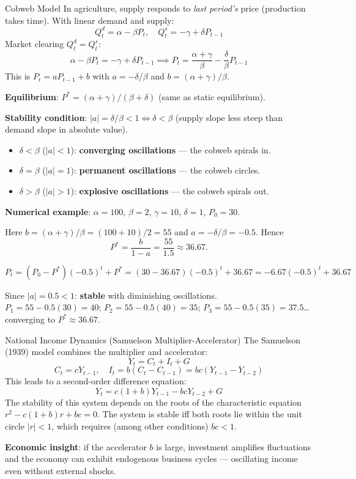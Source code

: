 \documentclass[12pt, a4paper]{article}
\theoremstyle{definition}
\begin{document}
\begin{exbox}{Cobweb Model}
In agriculture, supply responds to \emph{last period's} price (production
takes time). With linear demand and supply:
\[
  Q_t^d = \alpha - \beta P_t, \quad Q_t^s = -\gamma + \delta P_{t-1}
\]
Market clearing $Q_t^d = Q_t^s$:
\[
  \alpha - \beta P_t = -\gamma + \delta P_{t-1}
  \implies P_t = \frac{\alpha+\gamma}{\beta} - \frac{\delta}{\beta}P_{t-1}
\]
This is $P_t = aP_{t-1} + b$ with $a = -\delta/\beta$ and $b=(\alpha+\gamma)/\beta$.

\textbf{Equilibrium}: $P^* = (\alpha+\gamma)/(\beta+\delta)$ (same as static equilibrium).

\textbf{Stability condition}: $|a|=\delta/\beta < 1 \iff \delta < \beta$
(supply slope less steep than demand slope in absolute value).

\begin{itemize}
  \item $\delta < \beta$ ($|a|<1$): \textbf{converging oscillations} --- the cobweb spirals in.
  \item $\delta = \beta$ ($|a|=1$): \textbf{permanent oscillations} --- the cobweb circles.
  \item $\delta > \beta$ ($|a|>1$): \textbf{explosive oscillations} --- the cobweb spirals out.
\end{itemize}

\textbf{Numerical example}: $\alpha=100$, $\beta=2$, $\gamma=10$, $\delta=1$,
$P_0=30$.

Here $b=(\alpha+\gamma)/\beta=(100+10)/2=55$ and
$a=-\delta/\beta=-0.5$. Hence
\[
  P^*=\frac{b}{1-a}=\frac{55}{1.5}\approx 36.67.
\]

$P_t = (P_0-P^*)(-0.5)^t + P^* = (30-36.67)(-0.5)^t + 36.67 = -6.67(-0.5)^t+36.67$

Since $|a|=0.5<1$: \textbf{stable} with diminishing oscillations.
$P_1 = 55-0.5(30)=40$; $P_2=55-0.5(40)=35$; $P_3=55-0.5(35)=37.5$\ldots
converging to $P^*\approx36.67$.
\end{exbox}

\begin{exbox}{National Income Dynamics (Samuelson Multiplier-Accelerator)}
The Samuelson (1939) model combines the multiplier and accelerator:
\[
  Y_t = C_t + I_t + G
\]
\[
  C_t = cY_{t-1}, \quad I_t = b(C_t - C_{t-1}) = bc(Y_{t-1}-Y_{t-2})
\]
This leads to a second-order difference equation:
\[
  Y_t = c(1+b)Y_{t-1} - bcY_{t-2} + G
\]
The stability of this system depends on the roots of the characteristic
equation $r^2 - c(1+b)r + bc = 0$. The system is stable iff both roots
lie within the unit circle $|r|<1$, which requires (among other conditions)
$bc<1$.

\textbf{Economic insight}: if the accelerator $b$ is large, investment
amplifies fluctuations and the economy can exhibit endogenous business cycles
--- oscillating income even without external shocks.
\end{exbox}
\newpage
\end{document}
